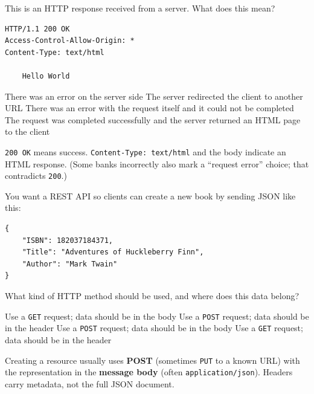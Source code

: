 \question[4]
This is an HTTP response received from a server. What does this mean?
\begin{lstlisting}[style=http]
HTTP/1.1 200 OK
Access-Control-Allow-Origin: *
Content-Type: text/html

    Hello World
\end{lstlisting}
\begin{choices}
  \choice There was an error on the server side
  \choice The server redirected the client to another URL
  \choice There was an error with the request itself and it could not be completed
  \CorrectChoice The request was completed successfully and the server returned an HTML page to the client
\end{choices}
\begin{solution}
  \texttt{200 OK} means success. \texttt{Content-Type: text/html} and the body indicate an HTML response. (Some banks incorrectly also mark a ``request error'' choice; that contradicts \texttt{200}.)
\end{solution}


\newpage

\question[4]
You want a REST API so clients can create a new book by sending JSON like this:
\begin{lstlisting}[style=java]
{
    "ISBN": 182037184371,
    "Title": "Adventures of Huckleberry Finn",
    "Author": "Mark Twain"
}
\end{lstlisting}
What kind of HTTP method should be used, and where does this data belong?
\begin{choices}
  \choice Use a \texttt{GET} request; data should be in the body
  \choice Use a \texttt{POST} request; data should be in the header
  \CorrectChoice Use a \texttt{POST} request; data should be in the body
  \choice Use a \texttt{GET} request; data should be in the header
\end{choices}
\begin{solution}
  Creating a resource usually uses \textbf{POST} (sometimes \texttt{PUT} to a known URL) with the representation in the \textbf{message body} (often \texttt{application/json}). Headers carry metadata, not the full JSON document.
\end{solution}

